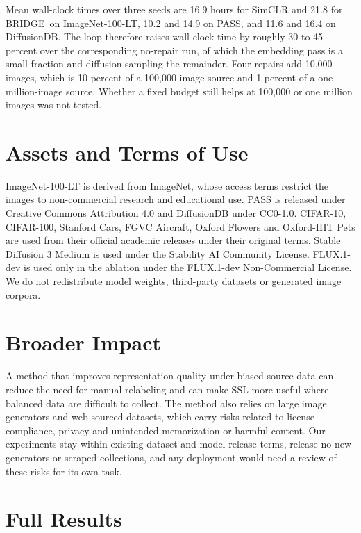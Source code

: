 \documentclass{article}
\newcommand{\method}{BRIDGE}
\begin{document}
Mean wall-clock times over three seeds are 16.9 hours for SimCLR and 21.8 for \method\ on ImageNet-100-LT, 10.2 and 14.9 on PASS, and 11.6 and 16.4 on DiffusionDB. The loop therefore raises wall-clock time by roughly 30 to 45 percent over the corresponding no-repair run, of which the embedding pass is a small fraction and diffusion sampling the remainder. Four repairs add 10{,}000 images, which is 10 percent of a 100{,}000-image source and 1 percent of a one-million-image source. Whether a fixed budget still helps at 100{,}000 or one million images was not tested.

\section{Assets and Terms of Use}
\label{app:assets}
ImageNet-100-LT is derived from ImageNet, whose access terms restrict the images to non-commercial research and educational use. PASS is released under Creative Commons Attribution 4.0 and DiffusionDB under CC0-1.0. CIFAR-10, CIFAR-100, Stanford Cars, FGVC Aircraft, Oxford Flowers and Oxford-IIIT Pets are used from their official academic releases under their original terms. Stable Diffusion 3 Medium is used under the Stability AI Community License. FLUX.1-dev is used only in the ablation under the FLUX.1-dev Non-Commercial License. We do not redistribute model weights, third-party datasets or generated image corpora.

\section{Broader Impact}
\label{app:impact}
A method that improves representation quality under biased source data can reduce the need for manual relabeling and can make SSL more useful where balanced data are difficult to collect. The method also relies on large image generators and web-sourced datasets, which carry risks related to license compliance, privacy and unintended memorization or harmful content. Our experiments stay within existing dataset and model release terms, release no new generators or scraped collections, and any deployment would need a review of these risks for its own task.

\section{Full Results}
\label{app:full-results}












\end{document}
